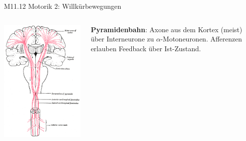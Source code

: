 \documentclass{beamer}
\begin{document}
\begin{frame}{M11.12 Motorik 2: Willkürbewegungen}
\begin{columns}[c]
\begin{column}{6.5cm}
\begin{columns}[c]
\begin{column}{3cm}
\begin{center}
    \includegraphics[width=\textwidth]{pyramidenbahn.png}
\end{center}
\end{column}


\begin{column}{3.5cm}



\textbf{Pyramidenbahn}: Axone aus dem Kortex (meist) über Interneurone zu \(\alpha\)-Motoneuronen. Afferenzen erlauben Feedback über Ist-Zustand.


\end{column}


\end{columns}


\end{column}






\end{columns}



\end{frame}
\end{document}

